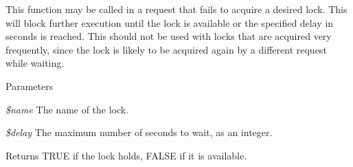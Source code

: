 This function may be called in a request that fails to acquire a desired lock. This will block further execution until the lock is available or the specified delay in seconds is reached. This should not be used with locks that are acquired very frequently, since the lock is likely to be acquired again by a different request while waiting.


\begin{DoxyParams}{Parameters}
\item[{\em \$name}]The name of the lock. \item[{\em \$delay}]The maximum number of seconds to wait, as an integer.\end{DoxyParams}
\begin{DoxyReturn}{Returns}
TRUE if the lock holds, FALSE if it is available. 
\end{DoxyReturn}
